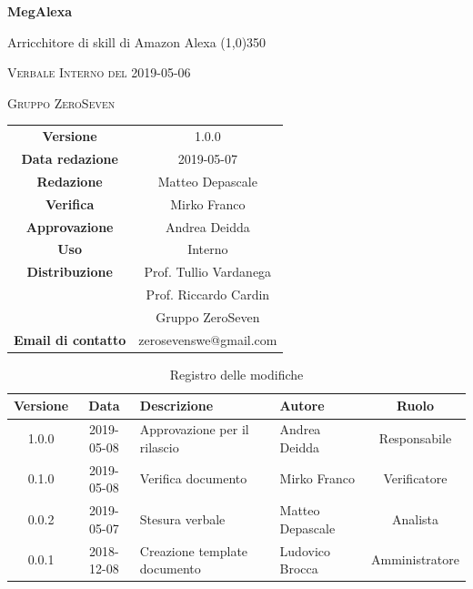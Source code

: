 \documentclass[a4paper,12pt]{article}
\author{Matteo Depascale}
\date{2019-05-07}
\begin{document}
	\begin{titlepage}
		\centering
		{\huge\bfseries MegAlexa\par}
		Arricchitore di skill di Amazon Alexa
		\line(1,0){350} \\
		{\scshape\LARGE Verbale Interno del 2019-05-06 \par}
		\vspace{1cm}
		{\scshape Gruppo ZeroSeven \par}
		\logo
		\begin{tabular}{c|c}
			{\hfill \textbf{Versione}} 			& 1.0.0				\\
			{\hfill\textbf{Data redazione}} 	& 2019-05-07\\ 
			{\hfill\textbf{Redazione}} 			&  Matteo Depascale	\\ 
			{\hfill\textbf{Verifica}} 				&  	  	Mirko Franco\\ 
			{\hfill\textbf{Approvazione}} 		&  Andrea Deidda\\ 
			{\hfill\textbf{Uso}} 					& 	Interno	\\ 
			{\hfill\textbf{Distribuzione}} 			& 			Prof. Tullio Vardanega \\ & Prof. Riccardo Cardin \\ & Gruppo ZeroSeven \\ 
			{\hfill\textbf{Email di contatto}} & zerosevenswe@gmail.com \\
		\end{tabular}
	\end{titlepage}
	
	
	
	\label{LastFrontPage}
	
	
	\newpage
	\cleardoublepage
	\begin{table}[tbph]
		\centering
		\begin{tabularx}{\textwidth}{|c|c|X|X|c|}
			\hline
			\textbf{Versione} & \textbf{Data} & \textbf{Descrizione} & \textbf{Autore} & \textbf{Ruolo} \\
			\hline
			1.0.0 & 2019-05-08 & Approvazione per il rilascio & Andrea Deidda & Responsabile \\
			\hline
			0.1.0 & 2019-05-08 & Verifica documento & Mirko Franco & Verificatore \\
			\hline
			0.0.2 & 2019-05-07 & Stesura verbale & Matteo Depascale & Analista \\
			\hline
			0.0.1 & 2018-12-08 & Creazione template documento & Ludovico Brocca & Amministratore\\
			\hline
		\end{tabularx}
		\caption{Registro delle modifiche}
	\end{table}
	\cleardoublepage
	\pagestyle{mymain}
	
\end{document}
